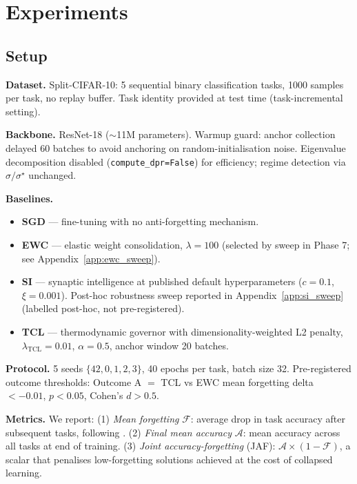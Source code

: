 
\section{Experiments}
\label{sec:experiments}

\subsection{Setup}
\label{sec:setup}

\textbf{Dataset.} Split-CIFAR-10: 5 sequential binary classification tasks, 1000
samples per task, no replay buffer. Task identity provided at test time
(task-incremental setting).

\textbf{Backbone.} ResNet-18 ($\sim$11M parameters). Warmup guard: anchor
collection delayed 60 batches to avoid anchoring on random-initialisation noise.
Eigenvalue decomposition disabled (\texttt{compute\_dpr=False}) for efficiency;
regime detection via $\sigma/\sigma^\star$ unchanged.

\textbf{Baselines.}
\begin{itemize}
    \item \textbf{SGD} — fine-tuning with no anti-forgetting mechanism.
    \item \textbf{EWC}  — elastic weight consolidation,
          $\lambda=100$ (selected by sweep in Phase 7; see Appendix~\ref{app:ewc_sweep}).
    \item \textbf{SI}  — synaptic intelligence at published default
          hyperparameters ($c=0.1$, $\xi=0.001$). Post-hoc robustness sweep reported in
          Appendix~\ref{app:si_sweep} (labelled post-hoc, not pre-registered).
    \item \textbf{TCL} — thermodynamic governor with dimensionality-weighted L2 penalty,
          $\lambda_{\text{TCL}}=0.01$, $\alpha=0.5$, anchor window 20 batches.
\end{itemize}

\textbf{Protocol.} 5 seeds $\{42, 0, 1, 2, 3\}$, 40 epochs per task, batch size 32.
Pre-registered outcome thresholds: Outcome A $= $ TCL vs EWC mean forgetting delta
$< -0.01$, $p < 0.05$, Cohen's $d > 0.5$.

\textbf{Metrics.} We report:
(1) \emph{Mean forgetting} $\mathcal{F}$: average drop in task accuracy after subsequent
tasks, following .
(2) \emph{Final mean accuracy} $\mathcal{A}$: mean accuracy across all tasks at end of
training.
(3) \emph{Joint accuracy-forgetting} (JAF): $\mathcal{A} \times (1 - \mathcal{F})$,
a scalar that penalises low-forgetting solutions achieved at the cost of collapsed learning.


